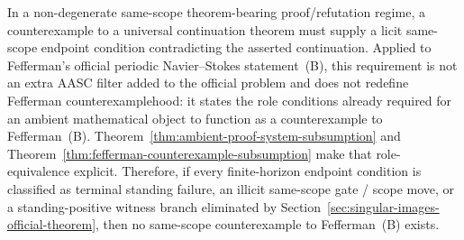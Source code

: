 \begin{manualtheorem}
\label{thm:counterexample-soundness-fixed-same-scope}
In a non-degenerate same-scope theorem-bearing proof/refutation regime, a counterexample to a universal continuation theorem must supply a licit same-scope endpoint condition contradicting the asserted continuation. Applied to Fefferman's official periodic Navier--Stokes statement~(B), this requirement is not an extra AASC filter added to the official problem and does not redefine Fefferman counterexamplehood: it states the role conditions already required for an ambient mathematical object to function as a counterexample to Fefferman~(B). Theorem~\ref{thm:ambient-proof-system-subsumption} and Theorem~\ref{thm:fefferman-counterexample-subsumption} make that role-equivalence explicit. Therefore, if every finite-horizon endpoint condition is classified as terminal standing failure, an illicit same-scope gate / scope move, or a standing-positive witness branch eliminated by Section~\ref{sec:singular-images-official-theorem}, then no same-scope counterexample to Fefferman~(B) exists.
\end{manualtheorem}

